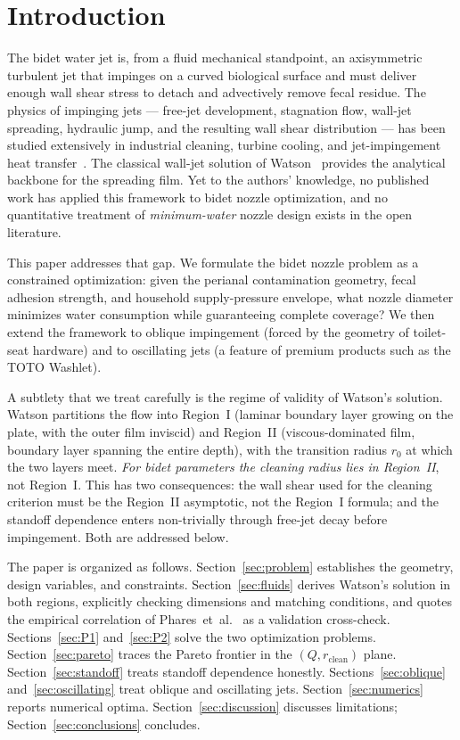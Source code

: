\documentclass[aps,prfluids,reprint,amsmath,amssymb,floatfix]{revtex4-2}
\begin{document}
\section{Introduction}
\label{sec:intro}

The bidet water jet is, from a fluid mechanical standpoint, an axisymmetric
turbulent jet that impinges on a curved biological surface and must
deliver enough wall shear stress to detach and advectively remove fecal
residue. The physics of impinging jets --- free-jet development, stagnation
flow, wall-jet spreading, hydraulic jump, and the resulting wall shear
distribution --- has been studied extensively in industrial cleaning,
turbine cooling, and jet-impingement heat transfer~\citep{ZuckermanLior2006}.
The classical wall-jet solution of Watson~\citep{Watson1964} provides the
analytical backbone for the spreading film. Yet to the authors' knowledge,
no published work has applied this framework to bidet nozzle optimization,
and no quantitative treatment of \emph{minimum-water} nozzle design exists
in the open literature.

This paper addresses that gap. We formulate the bidet nozzle problem as a
constrained optimization: given the perianal contamination geometry, fecal
adhesion strength, and household supply-pressure envelope, what nozzle
diameter minimizes water consumption while guaranteeing complete coverage?
We then extend the framework to oblique impingement (forced by the
geometry of toilet-seat hardware) and to oscillating jets (a feature of
premium products such as the TOTO Washlet).

A subtlety that we treat carefully is the regime of validity of Watson's
solution. Watson partitions the flow into Region~I (laminar boundary
layer growing on the plate, with the outer film inviscid) and Region~II
(viscous-dominated film, boundary layer spanning the entire depth), with
the transition radius $r_0$ at which the two layers meet. \emph{For
bidet parameters the cleaning radius lies in Region~II}, not Region~I.
This has two consequences: the wall shear used for the cleaning criterion
must be the Region~II asymptotic, not the Region~I formula; and the
standoff dependence enters non-trivially through free-jet decay before
impingement. Both are addressed below.

The paper is organized as follows. Section~\ref{sec:problem} establishes
the geometry, design variables, and constraints. Section~\ref{sec:fluids}
derives Watson's solution in both regions, explicitly checking dimensions
and matching conditions, and quotes the empirical correlation of
Phares~et~al.~\citep{Phares2000} as a validation cross-check.
Sections~\ref{sec:P1} and~\ref{sec:P2} solve the two optimization problems.
Section~\ref{sec:pareto} traces the Pareto frontier in the $(Q, r_\mathrm{clean})$
plane. Section~\ref{sec:standoff} treats standoff dependence honestly.
Sections~\ref{sec:oblique} and~\ref{sec:oscillating} treat oblique and
oscillating jets. Section~\ref{sec:numerics} reports numerical optima.
Section~\ref{sec:discussion} discusses limitations; Section~\ref{sec:conclusions}
concludes.
\end{document}
